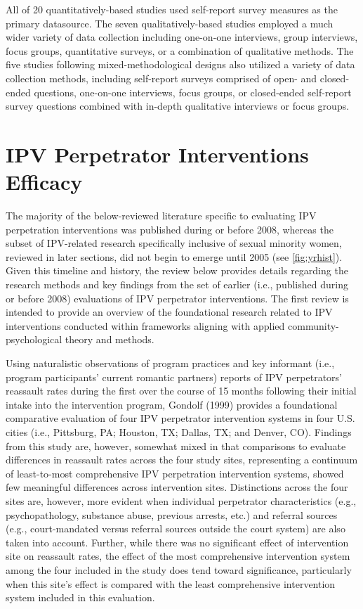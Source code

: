 \documentclass[11pt,]{tufte-book}
\begin{document}
All of 20 quantitatively-based studies used self-report survey measures
as the primary datasource. The seven qualitatively-based studies
employed a much wider variety of data collection including one-on-one
interviews, group interviews, focus groups, quantitative surveys, or a
combination of qualitative methods. The five studies following
mixed-methodological designs also utilized a variety of data collection
methods, including self-report surveys comprised of open- and
closed-ended questions, one-on-one interviews, focus groups, or
closed-ended self-report survey questions combined with in-depth
qualitative interviews or focus groups.

\chapter{IPV Perpetrator Interventions
Efficacy}\label{ipv-perpetrator-interventions-efficacy}

The majority of the below-reviewed literature specific to evaluating IPV
perpetration interventions was published during or before 2008, whereas
the subset of IPV-related research specifically inclusive of sexual
minority women, reviewed in later sections, did not begin to emerge
until 2005 (see \cref{fig:yrhist}). Given this timeline
and history, the review below provides details regarding the research
methods and key findings from the set of earlier (i.e., published during
or before 2008) evaluations of IPV perpetrator interventions. The first
review is intended to provide an overview of the foundational research
related to IPV interventions conducted within frameworks aligning with
applied community-psychological theory and methods.

Using naturalistic observations of program practices and key informant
(i.e., program participants' current romantic partners) reports of IPV
perpetrators' reassault rates during the first over the course of 15
months following their initial intake into the intervention program,
Gondolf (1999) provides a foundational comparative evaluation of four
IPV perpetrator intervention systems in four U.S. cities (i.e.,
Pittsburg, PA; Houston, TX; Dallas, TX; and Denver, CO). Findings from
this study are, however, somewhat mixed in that comparisons to evaluate
differences in reassault rates across the four study sites, representing
a continuum of least-to-most comprehensive IPV perpetration intervention
systems, showed few meaningful differences across intervention sites.
Distinctions across the four sites are, however, more evident when
individual perpetrator characteristics (e.g., psychopathology, substance
abuse, previous arrests, etc.) and referral sources (e.g.,
court-mandated versus referral sources outside the court system) are
also taken into account. Further, while there was no significant effect
of intervention site on reassault rates, the effect of the most
comprehensive intervention system among the four included in the study
does tend toward significance, particularly when this site's effect is
compared with the least comprehensive intervention system included in
this evaluation.
\end{document}
